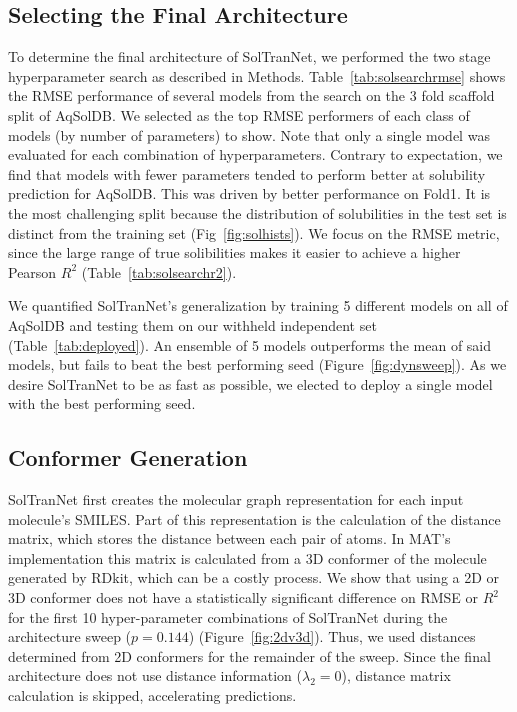 \documentclass[journal=jmcmar,manuscript=article]{achemso}
\begin{document}
\subsection{Selecting the Final Architecture}

To determine the final architecture of SolTranNet, we performed the two stage hyperparameter search as described in Methods.
Table~\ref{tab:solsearchrmse} shows the RMSE performance of several models from the search on the 3 fold scaffold split of AqSolDB.
We selected as the top RMSE performers of each class of models (by number of parameters) to show.
Note that only a single model was evaluated for each combination of hyperparameters.
Contrary to expectation, we find that models with fewer parameters tended to perform better at solubility prediction for AqSolDB.
This was driven by better performance on Fold1.
It is the most challenging split because the distribution of solubilities in the test set is distinct from the training set (Fig~\ref{fig:solhists}).
We focus on the RMSE metric, since the large range of true solibilities makes it easier to achieve a higher Pearson $R^2$ (Table~\ref{tab:solsearchr2}).

We quantified SolTranNet's generalization by training 5 different models on all of AqSolDB and testing them on our withheld independent set (Table~\ref{tab:deployed}).
An ensemble of 5 models outperforms the mean of said models, but fails to beat the best performing seed (Figure~\ref{fig:dynsweep}).
As we desire SolTranNet to be as fast as possible, we elected to deploy a single model with the best performing seed.

\subsection{Conformer Generation}

SolTranNet first creates the molecular graph representation for each input molecule's SMILES.
Part of this representation is the calculation of the distance matrix, which stores the distance between each pair of atoms.
In MAT's implementation this matrix is calculated from a 3D conformer of the molecule generated by RDkit, which can be a costly process.
We show that using a 2D or 3D conformer does not have a statistically significant difference on RMSE or $R^2$ for the first 10 hyper-parameter combinations of SolTranNet during the architecture sweep ($p=0.144$) (Figure~\ref{fig:2dv3d}).
Thus, we used distances determined from 2D conformers for the remainder of the sweep. 
Since the final architecture does not use distance information ($\lambda_2 = 0$), distance matrix calculation is skipped, accelerating predictions.
\end{document}
